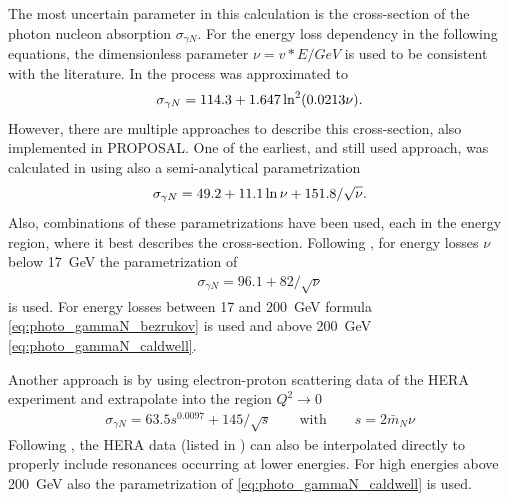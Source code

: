 The most uncertain parameter in this calculation is the cross-section of the photon nucleon absorption $\sigma_{\gamma N}$.
For the energy loss dependency in the following equations, the dimensionless parameter $\nu = v * E / GeV$ is used to be consistent with the literature.
In \cite{Bezrukov81} the process was approximated to
\begin{align} \label{eq:photo_gammaN_bezrukov}
    \sigma_{\gamma N} = 114.3 + 1.647 \operatorname{ln}^2 (0.0213 \nu) .
\end{align}
However, there are multiple approaches to describe this cross-section, also implemented in PROPOSAL.
One of the earliest, and still used approach, was calculated in \cite{Caldwell79} using also a semi-analytical parametrization
\begin{align} \label{eq:photo_gammaN_caldwell}
    \sigma_{\gamma N} = 49.2 + 11.1 \operatorname{ln} \nu + 151.8 / \sqrt{\nu} .
\end{align}
Also, combinations of these parametrizations have been used, each in the energy region, where it best describes the cross-section.
Following \cite{Kokoulin97}, for energy losses $\nu$ below \SI{17}{GeV} the parametrization of \cite{Borog75}
\begin{align}
    \sigma_{\gamma N} = 96.1 + 82 / \sqrt{\nu}
\end{align}
is used. For energy losses between 17 and \SI{200}{GeV} formula \eqref{eq:photo_gammaN_bezrukov} is used and above \SI{200}{GeV} \eqref{eq:photo_gammaN_caldwell}.

Another approach is by using electron-proton scattering data of the HERA experiment and extrapolate into the region $Q^2 \to 0$ \cite{Breitweg99ZEUS}
\begin{align}
    \sigma_{\gamma N} = 63.5 s^{0.0097} + 145 /\sqrt{s}
    \qquad \text{with} \qquad
    s = 2 \bar{m}_N \nu
\end{align}
Following \cite{Rhode93PhD}, the HERA data (listed in ) can also be interpolated directly to properly include resonances occurring at lower energies.
For high energies above \SI{200}{GeV} also the parametrization of \eqref{eq:photo_gammaN_caldwell} is used.

